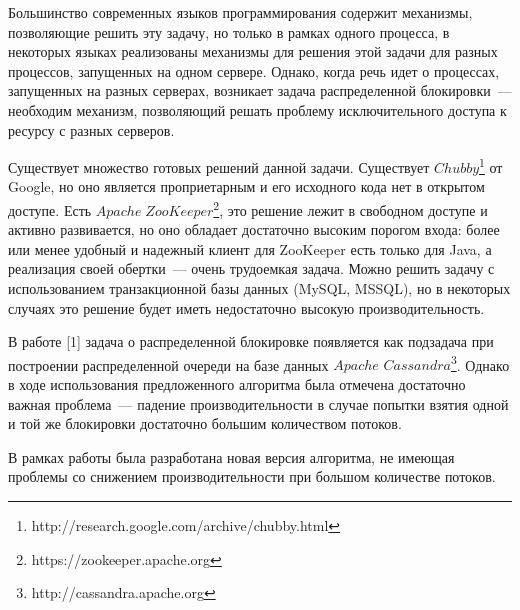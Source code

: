 Большинство современных языков программирования содержит механизмы, позволяющие решить эту задачу, но только в рамках одного процесса, в некоторых языках реализованы механизмы для решения этой задачи для разных процессов, запущенных на одном сервере. Однако, когда речь идет о процессах, запущенных на разных серверах, возникает задача распределенной блокировки~--- необходим механизм, позволяющий решать проблему исключительного доступа к ресурсу с разных серверов.

Существует множество готовых решений данной задачи. Существует $Chubby$\footnote{http://research.google.com/archive/chubby.html} от Google, но оно является проприетарным и его исходного кода нет в открытом доступе. Есть $Apache\;ZooKeeper$\footnote{https://zookeeper.apache.org}, это решение лежит в свободном доступе и активно развивается, но оно обладает достаточно высоким порогом входа: более или менее удобный и надежный клиент для ZooKeeper есть только для Java, а реализация своей обертки~--- очень трудоемкая задача. Можно решить задачу с использованием транзакционной базы данных (MySQL, MSSQL), но в некоторых случаях это решение будет иметь недостаточно высокую производительность.

В работе [1] задача о распределенной блокировке появляется как подзадача при построении распределенной очереди на базе данных $Apache$ $Cassandra$\footnote{http://cassandra.apache.org}. Однако в ходе использования предложенного алгоритма была отмечена достаточно важная проблема~--- падение производительности в случае попытки взятия одной и той же блокировки достаточно большим количеством потоков.

В рамках работы была разработана новая версия алгоритма, не имеющая проблемы со снижением производительности при большом количестве потоков.

